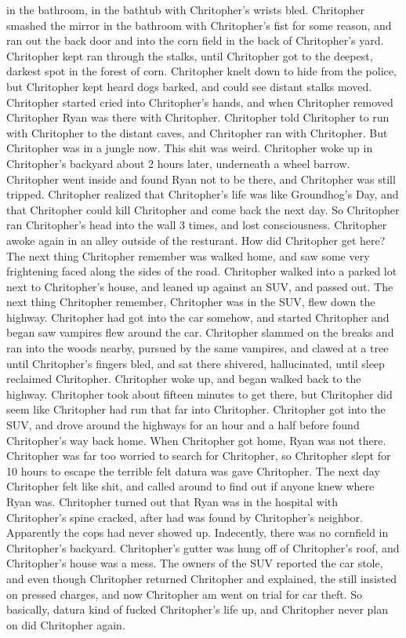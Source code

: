 \documentclass[12pt]{book}
\begin{document}
in the bathroom, in the bathtub with Chritopher's wrists bled. Chritopher smashed the mirror in the bathroom with Chritopher's fist for some reason, and ran out the back door and into the corn field in the back of Chritopher's yard. Chritopher kept ran through the stalks, until Chritopher got to the deepest, darkest spot in the forest of corn. Chritopher knelt down to hide from the police, but Chritopher kept heard dogs barked, and could see distant stalks moved. Chritopher started cried into Chritopher's hands, and when Chritopher removed Chritopher Ryan was there with Chritopher. Chritopher told Chritopher to run with Chritopher to the distant caves, and Chritopher ran with Chritopher. But Chritopher was in a jungle now. This shit was weird. Chritopher woke up in Chritopher's backyard about 2 hours later, underneath a wheel barrow. Chritopher went inside and found Ryan not to be there, and Chritopher was still tripped. Chritopher realized that Chritopher's life was like Groundhog's Day, and that Chritopher could kill Chritopher and come back the next day. So Chritopher ran Chritopher's head into the wall 3 times, and lost consciousness. Chritopher awoke again in an alley outside of the resturant. How did Chritopher get here? The next thing Chritopher remember was walked home, and saw some very frightening faced along the sides of the road. Chritopher walked into a parked lot next to Chritopher's house, and leaned up against an SUV, and passed out. The next thing Chritopher remember, Chritopher was in the SUV, flew down the highway. Chritopher had got into the car somehow, and started Chritopher and began saw vampires flew around the car. Chritopher slammed on the breaks and ran into the woods nearby, pursued by the same vampires, and clawed at a tree until Chritopher's fingers bled, and sat there shivered, hallucinated, until sleep reclaimed Chritopher. Chritopher woke up, and began walked back to the highway. Chritopher took about fifteen minutes to get there, but Chritopher did seem like Chritopher had run that far into Chritopher. Chritopher got into the SUV, and drove around the highways for an hour and a half before found Chritopher's way back home. When Chritopher got home, Ryan was not there. Chritopher was far too worried to search for Chritopher, so Chritopher slept for 10 hours to escape the terrible felt datura was gave Chritopher. The next day Chritopher felt like shit, and called around to find out if anyone knew where Ryan was. Chritopher turned out that Ryan was in the hospital with Chritopher's spine cracked, after had was found by Chritopher's neighbor. Apparently the cops had never showed up. Indecently, there was no cornfield in Chritopher's backyard. Chritopher's gutter was hung off of Chritopher's roof, and Chritopher's house was a mess. The owners of the SUV reported the car stole, and even though Chritopher returned Chritopher and explained, the still insisted on pressed charges, and now Chritopher am went on trial for car theft. So basically, datura kind of fucked Chritopher's life up, and Chritopher never plan on did Chritopher again.
\end{document}
